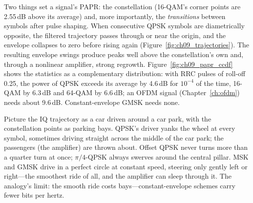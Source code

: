 Two things set a signal's PAPR: the constellation (16-QAM's corner points are 2.55\,dB above its
average) and, more importantly, the \emph{transitions} between symbols after pulse shaping. When
consecutive QPSK symbols are diametrically opposite, the filtered trajectory passes through or
near the origin, and the envelope collapses to zero before rising again
(Figure~\ref{fig:ch09_trajectories}). The resulting envelope swings produce peaks well above the
constellation's own and, through a nonlinear amplifier, strong regrowth.
Figure~\ref{fig:ch09_papr_ccdf} shows the statistics as a complementary distribution: with RRC
pulses of roll-off 0.25, the power of QPSK exceeds its average by 4.6\,dB for $10^{-4}$ of the
time, 16-QAM by 6.3\,dB and 64-QAM by 6.6\,dB; an OFDM signal (Chapter~\ref{ch:ofdm}) needs about
9.6\,dB. Constant-envelope GMSK needs none.



\begin{analogy}
Picture the IQ trajectory as a car driven around a car park, with the constellation points as
parking bays. QPSK's driver yanks the wheel at every symbol, sometimes driving straight across
the middle of the car park; the passengers (the amplifier) are thrown about. Offset QPSK never
turns more than a quarter turn at once; $\pi/4$-QPSK always swerves around the central pillar.
MSK and GMSK drive in a perfect circle at constant speed, steering only gently left or right---the
smoothest ride of all, and the amplifier can sleep through it. The analogy's limit: the smooth
ride costs bays---constant-envelope schemes carry fewer bits per hertz.
\end{analogy}

